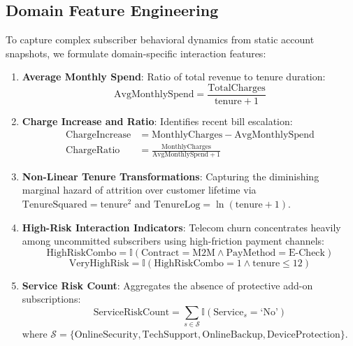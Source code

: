 \documentclass[conference]{IEEEtran}
\begin{document}
\subsection{Domain Feature Engineering}
To capture complex subscriber behavioral dynamics from static account snapshots, we formulate domain-specific interaction features:
\begin{enumerate}
    \item \textbf{Average Monthly Spend}: Ratio of total revenue to tenure duration:
    \begin{equation}
        \text{AvgMonthlySpend} = \frac{\text{TotalCharges}}{\text{tenure} + 1}
    \end{equation}
    \item \textbf{Charge Increase and Ratio}: Identifies recent bill escalation:
    \begin{align}
        \text{ChargeIncrease} &= \text{MonthlyCharges} - \text{AvgMonthlySpend} \\
        \text{ChargeRatio} &= \frac{\text{MonthlyCharges}}{\text{AvgMonthlySpend} + 1}
    \end{align}
    \item \textbf{Non-Linear Tenure Transformations}: Capturing the diminishing marginal hazard of attrition over customer lifetime via $\text{TenureSquared} = \text{tenure}^2$ and $\text{TenureLog} = \ln(\text{tenure} + 1)$.
    \item \textbf{High-Risk Interaction Indicators}: Telecom churn concentrates heavily among uncommitted subscribers using high-friction payment channels:
    \begin{equation}
        \text{HighRiskCombo} = \mathbb{I}(\text{Contract} = \text{M2M} \land \text{PayMethod} = \text{E-Check})
    \end{equation}
    \begin{equation}
        \text{VeryHighRisk} = \mathbb{I}(\text{HighRiskCombo} = 1 \land \text{tenure} \le 12)
    \end{equation}
    \item \textbf{Service Risk Count}: Aggregates the absence of protective add-on subscriptions:
    \begin{equation}
        \text{ServiceRiskCount} = \sum_{s \in \mathcal{S}} \mathbb{I}(\text{Service}_s = \text{`No'})
    \end{equation}
    where $\mathcal{S} = \{\text{OnlineSecurity}, \text{TechSupport}, \text{OnlineBackup}, \text{DeviceProtection}\}$.
\end{enumerate}
\end{document}
